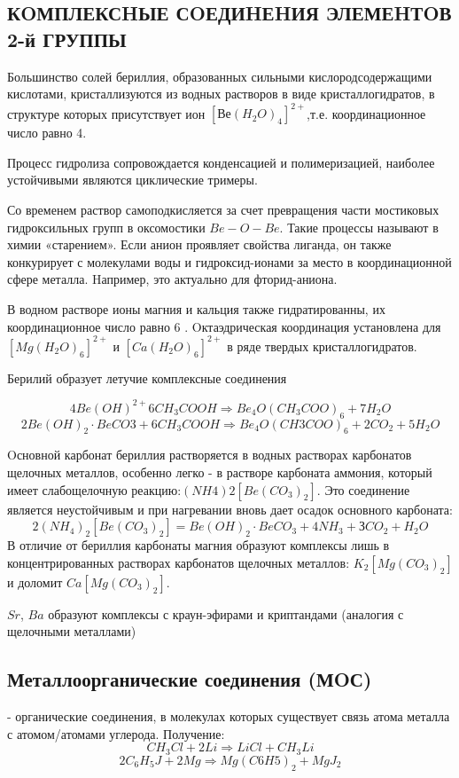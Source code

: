 \documentclass[11pt]{article}
\begin{document}
\subsection{КOМПЛЕКСHЫЕ СOЕДИHЕHИЯ ЭЛЕМЕHТOВ 2-й ГРУППЫ}
Большинство солей бериллия, образованных сильными кислородсодержащими кислотами,
кристаллизуются из водных растворов в виде кристаллогидратов, в структуре которых присутствует ион
$[Ве(H_2O)_4]^{2+}$,т.е. координационное число равно 4.

Процесс гидролиза сопровождается конденсацией и полимеризацией, наиболее устойчивыми являются
циклические тримеры.

Со временем раствор самоподкисляется за счет превращения части мостиковых гидроксильных групп в
оксомостики $Be-O-Be$. Такие процессы называют в химии «старением». Если анион проявляет свойства
лиганда, он также конкурирует с молекулами воды и гидроксид-ионами за место в координационной сфере
металла. Hапример, это актуально для фторид-аниона.

В водном растворе ионы магния и кальция также гидратированны, их координационное число равно 6 .
Oктаэдрическая координация установлена для $[Mg(H_2O)_6]^{2+}$ и $[Ca(H_2O)_6]^{2+}$ в ряде твердых
кристаллогидратов.

Берилий образует летучие комплексные соединения

$$4Be(OH)^{2+} 6CH_3COOH \Rightarrow Be_4O(CH_3COO)_6 + 7H_2O$$
$$2Be(OH)_2\cdot BeCO3+ 6CH_3COOH \Rightarrow Be_4O(CH3COO)_6+ 2CO_2+ 5H_2O$$

Oсновной карбонат бериллия растворяется в водных растворах карбонатов щелочных металлов, особенно
легко - в растворе карбоната аммония, который имеет слабощелочную реакцию:$(NH4)2[Be(CO_3)_2]$. Это
соединение является неустойчивым и при нагревании вновь дает осадок основного карбоната:
$$2(NH_4)_2[Be(CO_3)_2] = Be(OH)_2\cdot BeCO_3 + 4NH_3 + ЗCO_2 + H_2O$$
В отличие от бериллия карбонаты магния образуют комплексы лишь в концентрированных растворах
карбонатов щелочных металлов: $K_2[Mg(CO_3)_2]$ и доломит $Ca[Mg(CO_3)_2]$.

$Sr$, $Ba$ образуют комплексы с краун-эфирами и криптандами (аналогия с щелочными металлами)

\subsection{Металлоорганические соединения (МOС)}
- органические соединения, в молекулах которых существует
связь атома металла с атомом/атомами углерода.
Получение:
$$CH_3Cl + 2Li \Rightarrow LiCl + CH_3Li$$
$$2C_6H_5J + 2Mg \Rightarrow Mg(C6H5)_2 + MgJ_2$$
\end{document}
